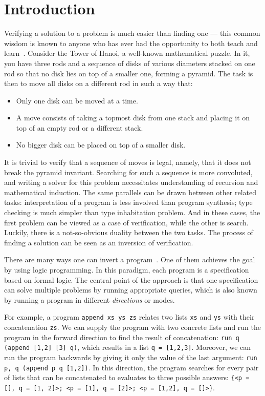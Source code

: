 \section{Introduction}

Verifying a solution to a problem is much easier than finding one --- this common wisdom is known to anyone who has ever had the opportunity to both teach and learn~\cite{lozov2019relational}. 
Consider the Tower of Hanoi, a well-known mathematical puzzle. 
In it, you have three rods and a sequence of disks of various diameters stacked on one rod so that no disk lies on top of a smaller one, forming a pyramid.
The task is then to move all disks on a different rod in such a way that: 
\begin{itemize}
    \item Only one disk can be moved at a time.
    \item A move consists of taking a topmost disk from one stack and placing it on top of an empty rod or a different stack.
    \item No bigger disk can be placed on top of a smaller disk. 
\end{itemize}

It is trivial to verify that a sequence of moves is legal, namely, that it does not break the pyramid invariant. 
Searching for such a sequence is more convoluted, and writing a solver for this problem necessitates understanding of recursion and mathematical induction. 
The same parallels can be drawn between other related tasks: interpretation of a program  is less involved than program synthesis; type checking is much simpler than type inhabitation problem.  
And in these cases, the first problem can be viewed as a case of verification, while the other is search. 
Luckily, there is a not-so-obvious duality between the two tasks.
The process of finding a solution can be seen as an inversion of verification.

There are many ways one can invert a program~\cite{SemanticsModifiers1,RevURA,aman2020foundations}. 
One of them achieves the goal by using logic programming. 
In this paradigm, each program is a specification based on formal logic. 
The central point of the approach is that one specification can solve multiple problems by running appropriate queries, which is also known by running a program in different \emph{directions} or modes. 

For example, a program \texttt{append xs ys zs} relates two lists \texttt{xs} and \texttt{ys} with their concatenation \texttt{zs}. 
We can supply the program with two concrete lists and run the program in the forward direction to find the result of concatenation: \texttt{run q (append [1,2] [3] q)}, which results in a list \texttt{q = [1,2,3]}. 
Moreover, we can run the program backwards by giving it only the value of the last argument: \texttt{run p, q (append p q [1,2])}.
In this direction, the program searches for every pair of lists that can be concatenated to  evaluates to three possible answers: \texttt{\{<p = [], q = [1, 2]>; <p = [1], q = [2]>; <p = [1,2], q = []>\}}. 

